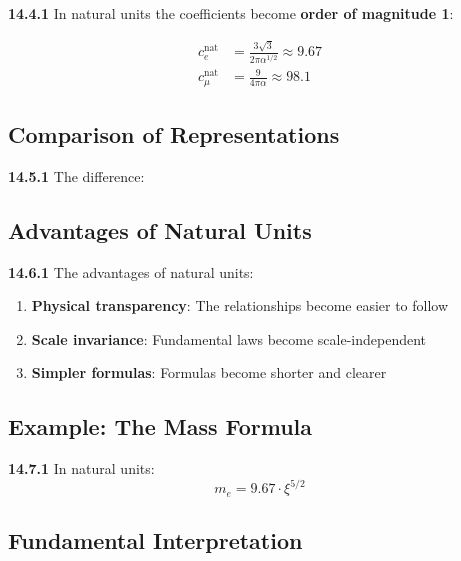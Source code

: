 \noindent \textbf{14.4.1} In natural units the coefficients become \textbf{order of magnitude 1}:

\begin{align*}
	c_e^{\text{nat}} &= \frac{3\sqrt{3}}{2\pi\alpha^{1/2}} \approx 9.67 \\
	c_\mu^{\text{nat}} &= \frac{9}{4\pi\alpha} \approx 98.1
\end{align*}

\subsection{Comparison of Representations}

\noindent \textbf{14.5.1} The difference:


\subsection{Advantages of Natural Units}

\noindent \textbf{14.6.1} The advantages of natural units:
\begin{enumerate}
	\item \textbf{Physical transparency}: The relationships become easier to follow
	\item \textbf{Scale invariance}: Fundamental laws become scale-independent
	\item \textbf{Simpler formulas}: Formulas become shorter and clearer
\end{enumerate}

\subsection{Example: The Mass Formula}

\noindent \textbf{14.7.1} In natural units:
\[
m_e = 9.67 \cdot \xi^{5/2}
\]

\subsection{Fundamental Interpretation}

